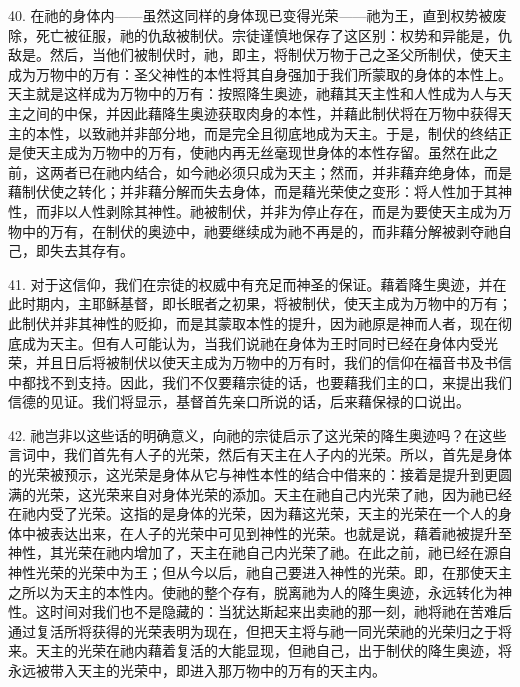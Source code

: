 40. 在祂的身体内——虽然这同样的身体现已变得光荣——祂为王，直到权势被废除，死亡被征服，祂的仇敌被制伏。宗徒谨慎地保存了这区别：权势和异能是，仇敌是。然后，当他们被制伏时，祂，即主，将制伏万物于己之圣父所制伏，使天主成为万物中的万有：圣父神性的本性将其自身强加于我们所蒙取的身体的本性上。天主就是这样成为万物中的万有：按照降生奥迹，祂藉其天主性和人性成为人与天主之间的中保，并因此藉降生奥迹获取肉身的本性，并藉此制伏将在万物中获得天主的本性，以致祂并非部分地，而是完全且彻底地成为天主。于是，制伏的终结正是使天主成为万物中的万有，使祂内再无丝毫现世身体的本性存留。虽然在此之前，这两者已在祂内结合，如今祂必须只成为天主；然而，并非藉弃绝身体，而是藉制伏使之转化；并非藉分解而失去身体，而是藉光荣使之变形：将人性加于其神性，而非以人性剥除其神性。祂被制伏，并非为停止存在，而是为要使天主成为万物中的万有，在制伏的奥迹中，祂要继续成为祂不再是的，而非藉分解被剥夺祂自己，即失去其存有。\par

41. 对于这信仰，我们在宗徒的权威中有充足而神圣的保证。藉着降生奥迹，并在此时期内，主耶稣基督，即长眠者之初果，将被制伏，使天主成为万物中的万有；此制伏并非其神性的贬抑，而是其蒙取本性的提升，因为祂原是神而人者，现在彻底成为天主。但有人可能认为，当我们说祂在身体为王时同时已经在身体内受光荣，并且日后将被制伏以使天主成为万物中的万有时，我们的信仰在福音书及书信中都找不到支持。因此，我们不仅要藉宗徒的话，也要藉我们主的口，来提出我们信德的见证。我们将显示，基督首先亲口所说的话，后来藉保禄的口说出。\par

42. 祂岂非以这些话的明确意义，向祂的宗徒启示了这光荣的降生奥迹吗？在这些言词中，我们首先有人子的光荣，然后有天主在人子内的光荣。所以，首先是身体的光荣被预示，这光荣是身体从它与神性本性的结合中借来的：接着是提升到更圆满的光荣，这光荣来自对身体光荣的添加。天主在祂自己内光荣了祂，因为祂已经在祂内受了光荣。这指的是身体的光荣，因为藉这光荣，天主的光荣在一个人的身体中被表达出来，在人子的光荣中可见到神性的光荣。也就是说，藉着祂被提升至神性，其光荣在祂内增加了，天主在祂自己内光荣了祂。在此之前，祂已经在源自神性光荣的光荣中为王；但从今以后，祂自己要进入神性的光荣。即，在那使天主之所以为天主的本性内。使祂的整个存有，脱离祂为人的降生奥迹，永远转化为神性。这时间对我们也不是隐藏的：当犹达斯起来出卖祂的那一刻，祂将祂在苦难后通过复活所将获得的光荣表明为现在，但把天主将与祂一同光荣祂的光荣归之于将来。天主的光荣在祂内藉着复活的大能显现，但祂自己，出于制伏的降生奥迹，将永远被带入天主的光荣中，即进入那万物中的万有的天主内。\par

